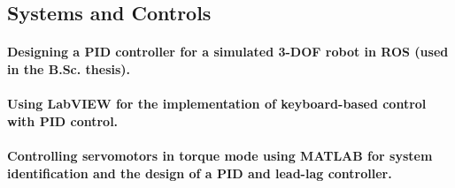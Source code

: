 \documentclass[a4paper]{article}
\begin{document}
        \subsection{Systems and Controls}
            \paragraph{Designing a PID controller for a simulated 3-DOF robot in ROS (used in the B.Sc. thesis).}
            \paragraph{Using LabVIEW for the implementation of keyboard-based control with PID control.}
            \paragraph{Controlling servomotors in torque mode using MATLAB for system identification and the design of a PID and lead-lag controller.}%
\end{document}
